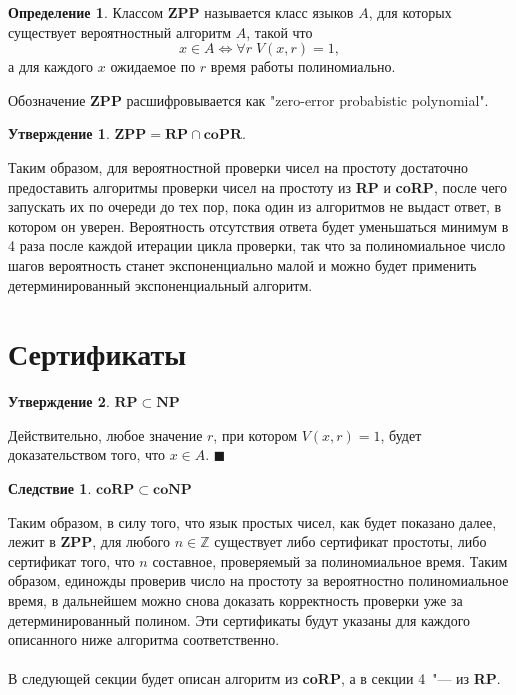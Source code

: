 \documentclass[12pt]{article}
\theoremstyle{definition}
\newtheorem{Def}{Определение}
\newtheorem{St}{Утверждение}
\newtheorem{Cor}{Следствие}
\numberwithin{Def}{section}
\numberwithin{Th}{section}
\numberwithin{St}{section}
\numberwithin{Cor}{section}
\newenvironment{Proof}                    
        {\par\noindent{\bf Доказательство.}}
        {\hfill$\scriptstyle\blacksquare$}
\begin{document}
\begin{Def}
	Классом \textbf{ZPP} называется класс языков $A$, для которых существует
	вероятностный алгоритм $A$, такой что
	$$
	x\in A\iff\forall r\; V(x,r)=1,
	$$
	а для каждого $x$ ожидаемое по $r$ время работы полиномиально.
\end{Def}

Обозначение \textbf{ZPP} расшифровывается как "zero-error probabistic
polynomial".

\begin{St}
	$\mathbf{ZPP=RP\cap coPR}$.
\end{St}

Таким образом, для вероятностной проверки чисел на простоту достаточно
предоставить алгоритмы проверки чисел на простоту из \textbf{RP} и \textbf{coRP},
после чего запускать их по очереди до тех пор, пока один из алгоритмов
не выдаст ответ, в котором он уверен. Вероятность отсутствия ответа будет
уменьшаться минимум в 4 раза после каждой итерации цикла проверки, так что
за полиномиальное число шагов вероятность станет экспоненциально малой и можно
будет применить детерминированный экспоненциальный алгоритм.

\section{Сертификаты}

\begin{St}
	$\mathbf{RP\subset NP}$
\end{St}

\begin{Proof}
	Действительно, любое значение $r$, при котором $V(x,r)=1$, будет доказательством
	того, что $x\in A$.
\end{Proof}

\begin{Cor}
	$\mathbf{coRP\subset coNP}$
\end{Cor}

Таким образом, в силу того, что язык простых чисел, как будет показано далее,
лежит в \textbf{ZPP}, для любого $n\in \mathbb{Z}$ существует либо сертификат простоты,
либо сертификат того, что $n$ составное, проверяемый за полиномиальное время.
Таким образом, единожды проверив число на простоту за вероятностно полиномиальное
время, в дальнейшем можно снова доказать корректность проверки уже за детерминированный 
полином.
Эти сертификаты будут указаны для каждого описанного ниже алгоритма соответственно.

\paragraph{} В следующей секции будет описан алгоритм из \textbf{coRP}, а в
секции 4~"--- из \textbf{RP}.
\end{document}
